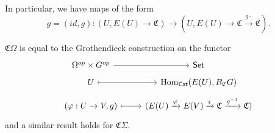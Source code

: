 \documentclass[a4paper,10pt
,draft
]{article}%
\renewcommand{\phi}{\varphi}
\renewcommand{\1}{\ensuremath{\mathbb{id}}}
\begin{document}
In particular, we have maps of the form
\begin{equation}
      g = (id, g): (U, E(U) \to \mathfrak C) \to (U, E(U) \to \mathfrak C \xrightarrow{g \cdot} \mathfrak C). 
\end{equation}

\begin{remark}
      $\mathfrak C \Omega$ is equal to the
      Grothendieck construction on the functor
      \begin{equation}
            \label{COMEGA_B_GR_EQ}
            \begin{tikzcd}[row sep = tiny]
                  \Omega^{op} \times G^{op} \arrow[r]
                  &
                  \mathsf{Set}
                  \\
                  U \arrow[r, mapsto]
                  &
                  \Hom_{\mathsf{Cat}}(E(U), B_{\mathfrak C}G)
                  \\
                  (\phi: U \to V, g) \arrow[r, mapsto]
                  &
                  (E(U) \xrightarrow{\phi} E(V) \xrightarrow{\mathfrak c} \mathfrak C \xrightarrow{g^{-1}} \mathfrak C)
            \end{tikzcd}
      \end{equation}
      and a similar result holds for $\mathfrak C \Sigma$. 
\end{remark}
\end{document}
